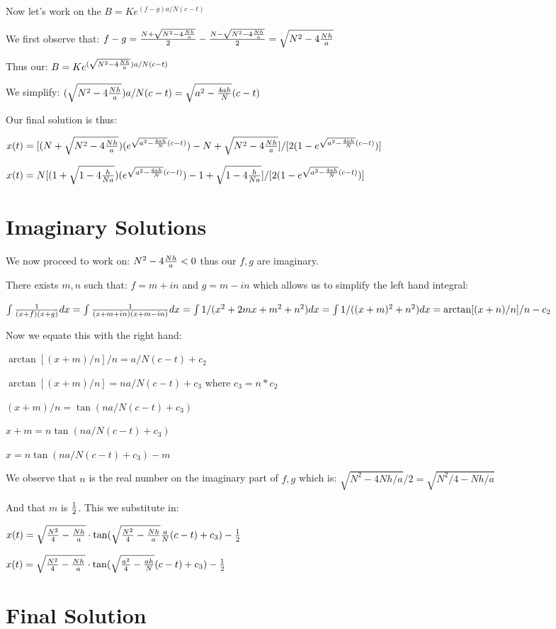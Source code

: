\documentclass[12pt,letterpaper]{article}
\begin{document}
Now let's work on the $B=Ke^{(f-g)a/N(c-t)}$

We first observe that: $f-g={N+\sqrt{N^2-4{Nh\over a}}\over 2}-{N-\sqrt{N^2-4{Nh\over a}}\over 2}=\sqrt{N^2-4{Nh\over a}}$

Thus our: $B=Ke^{(\sqrt{N^2-4{Nh\over a}})a/N(c-t)}$

We simplify: $(\sqrt{N^2-4{Nh\over a}})a/N(c-t)=\sqrt{a^2-{4ah\over N}}(c-t)$

Our final solution is thus:

$x(t)=[(N+\sqrt{N^2-4{Nh\over a}})(e^{\sqrt{a^2-{4ah\over N}}(c-t)})-N+\sqrt{N^2-4{Nh\over a}}]/[2(1-e^{\sqrt{a^2-{4ah\over N}}(c-t)})]$

$x(t)=N[(1+\sqrt{1-4{h\over Na}})(e^{\sqrt{a^2-{4ah\over N}}(c-t)})-1+\sqrt{1-4{h\over Na}}]/[2(1-e^{\sqrt{a^2-{4ah\over N}}(c-t)})]$

\section{Imaginary Solutions}

We now proceed to work on: $N^2-4{Nh\over a}<0$ thus our $f,g$  are imaginary.

There exists $m,n$ such that: $f=m+in$ and $g=m-in$ which allows us to simplify the left hand integral:

$\int {1\over(x+f)(x+g)}dx=\int {1\over (x+m+in)(x+m-in)}dx=\int 1/(x^2+2mx+m^2+n^2)dx=\int 1/((x+m)^2+n^2)dx=\arctan[{(x+n)/n}]/n-c_2$

Now we equate this with the right hand:

$\arctan[{(x+m)/n}]/n=a/N(c-t)+c_2$

$\arctan[(x+m)/n]=na/N(c-t)+c_3$ where $c_3=n*c_2$

$(x+m)/n=\tan(na/N(c-t)+c_3)$

$x+m = n\tan(na/N(c-t)+c_3)$

$x=n\tan(na/N(c-t)+c_3)-m$

We observe that $n$ is the real number on the imaginary part of $f,g$ which is: $\sqrt{N^2-4Nh/a}/2=\sqrt{N^2/4-Nh/a}$ 

And that $m$ is ${1\over 2}$. This we substitute in:

$x(t)=\sqrt{{N^2\over 4}-{Nh\over a}}\cdot \tan(\sqrt{{N^2\over 4}-{Nh\over a}}{a\over N}(c-t)+c_3)-{1\over 2}$

$x(t)=\sqrt{{N^2\over 4}-{Nh\over a}}\cdot \tan(\sqrt{{a^2\over 4}-{ah\over N}}(c-t)+c_3)-{1\over 2}$

\section{Final Solution}
\end{document}

